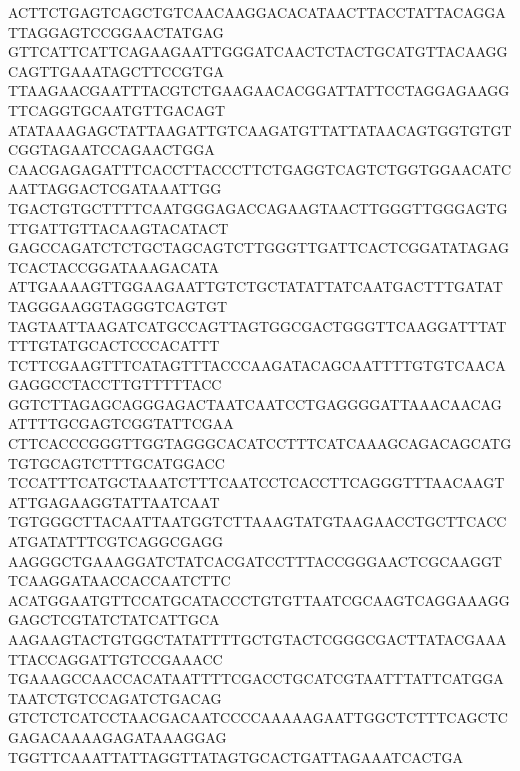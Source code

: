 ACTTCTGAGTCAGCTGTCAACAAGGACACATAACTTACCTATTACAGGATTAGGAGTCCGGAACTATGAG
GTTCATTCATTCAGAAGAATTGGGATCAACTCTACTGCATGTTACAAGGCAGTTGAAATAGCTTCCGTGA
TTAAGAACGAATTTACGTCTGAAGAACACGGATTATTCCTAGGAGAAGGTTCAGGTGCAATGTTGACAGT
ATATAAAGAGCTATTAAGATTGTCAAGATGTTATTATAACAGTGGTGTGTCGGTAGAATCCAGAACTGGA
CAACGAGAGATTTCACCTTACCCTTCTGAGGTCAGTCTGGTGGAACATCAATTAGGACTCGATAAATTGG
TGACTGTGCTTTTCAATGGGAGACCAGAAGTAACTTGGGTTGGGAGTGTTGATTGTTACAAGTACATACT
GAGCCAGATCTCTGCTAGCAGTCTTGGGTTGATTCACTCGGATATAGAGTCACTACCGGATAAAGACATA
ATTGAAAAGTTGGAAGAATTGTCTGCTATATTATCAATGACTTTGATATTAGGGAAGGTAGGGTCAGTGT
TAGTAATTAAGATCATGCCAGTTAGTGGCGACTGGGTTCAAGGATTTATTTTGTATGCACTCCCACATTT
TCTTCGAAGTTTCATAGTTTACCCAAGATACAGCAATTTTGTGTCAACAGAGGCCTACCTTGTTTTTACC
GGTCTTAGAGCAGGGAGACTAATCAATCCTGAGGGGATTAAACAACAGATTTTGCGAGTCGGTATTCGAA
CTTCACCCGGGTTGGTAGGGCACATCCTTTCATCAAAGCAGACAGCATGTGTGCAGTCTTTGCATGGACC
TCCATTTCATGCTAAATCTTTCAATCCTCACCTTCAGGGTTTAACAAGTATTGAGAAGGTATTAATCAAT
TGTGGGCTTACAATTAATGGTCTTAAAGTATGTAAGAACCTGCTTCACCATGATATTTCGTCAGGCGAGG
AAGGGCTGAAAGGATCTATCACGATCCTTTACCGGGAACTCGCAAGGTTCAAGGATAACCACCAATCTTC
ACATGGAATGTTCCATGCATACCCTGTGTTAATCGCAAGTCAGGAAAGGGAGCTCGTATCTATCATTGCA
AAGAAGTACTGTGGCTATATTTTGCTGTACTCGGGCGACTTATACGAAATTACCAGGATTGTCCGAAACC
TGAAAGCCAACCACATAATTTTCGACCTGCATCGTAATTTATTCATGGATAATCTGTCCAGATCTGACAG
GTCTCTCATCCTAACGACAATCCCCAAAAAGAATTGGCTCTTTCAGCTCGAGACAAAAGAGATAAAGGAG
TGGTTCAAATTATTAGGTTATAGTGCACTGATTAGAAATCACTGA

